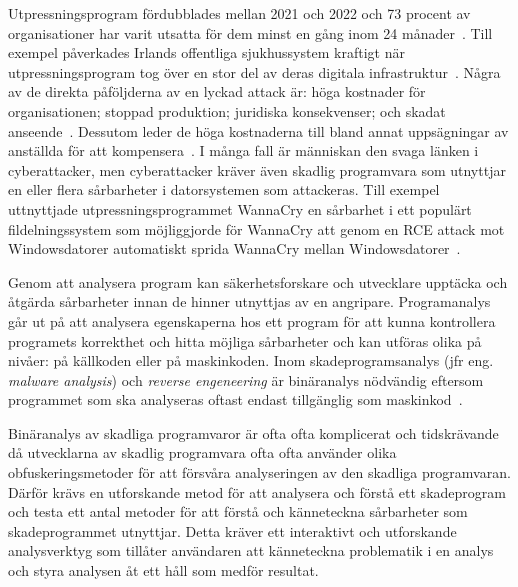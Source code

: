 Utpressningsprogram fördubblades mellan 2021 och 2022 och 73 procent av organisationer har varit utsatta för dem minst en gång inom 24 månader~\cite{cyberreason2021h cyberreason2022}.
Till exempel påverkades Irlands offentliga sjukhussystem kraftigt när utpressningsprogram tog över en stor del av deras digitala infrastruktur~\cite{hse_report, gallagher2023}.
Några av de direkta påföljderna av en lyckad attack är: höga kostnader för organisationen; stoppad produktion; juridiska konsekvenser; och skadat anseende~\cite{cyberreason2021, cyberreason2022}.
Dessutom leder de höga kostnaderna till bland annat uppsägningar av anställda för att kompensera~\cite{cyberreason2021, cyberreason2022}.
I många fall är människan den svaga länken i cyberattacker, men cyberattacker kräver även skadlig programvara som utnyttjar en eller flera sårbarheter i datorsystemen som attackeras.
Till exempel uttnyttjade utpressningsprogrammet WannaCry en sårbarhet i ett populärt fildelningssystem som möjliggjorde för WannaCry att genom en RCE attack mot Windowsdatorer automatiskt sprida WannaCry mellan Windowsdatorer~\cite{alraddadicomprehensive}.

Genom att analysera program kan säkerhetsforskare och utvecklare upptäcka och åtgärda sårbarheter innan de hinner utnyttjas av en angripare.
Programanalys går ut på att analysera egenskaperna hos ett program för att kunna kontrollera programets korrekthet och hitta möjliga sårbarheter och kan utföras olika på nivåer: på källkoden eller på maskinkoden.
Inom skadeprogramsanalys (jfr eng. \emph{malware analysis}) och \emph{reverse engeneering} är binäranalys nödvändig eftersom programmet som ska analyseras oftast endast tillgänglig som maskinkod~\cite{andriesse2018}.


Binäranalys av skadliga programvaror är ofta ofta komplicerat och tidskrävande då utvecklarna av skadlig programvara ofta ofta använder olika obfuskeringsmetoder för att försvåra analyseringen av den skadliga programvaran.
Därför krävs en utforskande metod för att analysera och förstå ett skadeprogram och testa ett antal metoder för att förstå och känneteckna sårbarheter som skadeprogrammet utnyttjar.
Detta kräver ett interaktivt och utforskande analysverktyg som tillåter användaren att känneteckna problematik i en analys och styra analysen åt ett håll som medför resultat.

